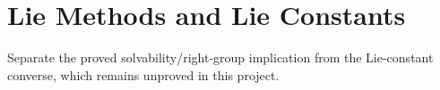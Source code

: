 \chapter{Lie Methods and Lie Constants}
\label{organized:lie}
Separate the proved solvability/right-group implication from the Lie-constant converse, which remains unproved in this project.



